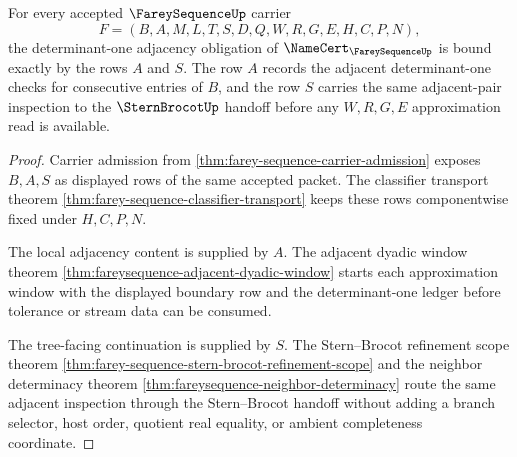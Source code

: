 \begin{theorem}
\label{thm:farey-sequence-adjacency-obligation}
For every accepted $\FareySequenceUp$ carrier
$$
F=(B,A,M,L,T,S,D,Q,W,R,G,E,H,C,P,N),
$$
the determinant-one adjacency obligation of $\NameCert_{\FareySequenceUp}$ is bound exactly by the rows $A$ and $S$. The row $A$ records the adjacent determinant-one checks for consecutive entries of $B$, and the row $S$ carries the same adjacent-pair inspection to the $\SternBrocotUp$ handoff before any $W,R,G,E$ approximation read is available.
\end{theorem}
\begin{proof}
Carrier admission from \autoref{thm:farey-sequence-carrier-admission} exposes $B,A,S$ as displayed rows of the same accepted packet. The classifier transport theorem \autoref{thm:farey-sequence-classifier-transport} keeps these rows componentwise fixed under $H,C,P,N$.

The local adjacency content is supplied by $A$. The adjacent dyadic window theorem \autoref{thm:fareysequence-adjacent-dyadic-window} starts each approximation window with the displayed boundary row and the determinant-one ledger before tolerance or stream data can be consumed.

The tree-facing continuation is supplied by $S$. The Stern--Brocot refinement scope theorem \autoref{thm:farey-sequence-stern-brocot-refinement-scope} and the neighbor determinacy theorem \autoref{thm:fareysequence-neighbor-determinacy} route the same adjacent inspection through the Stern--Brocot handoff without adding a branch selector, host order, quotient real equality, or ambient completeness coordinate.
\end{proof}

